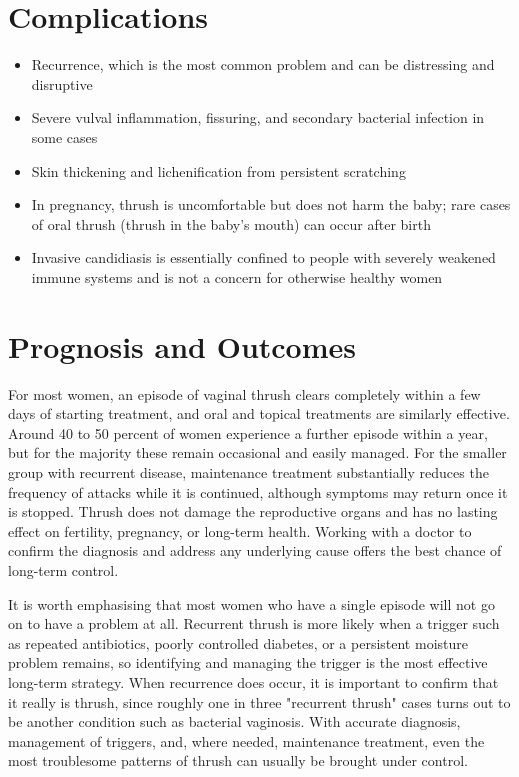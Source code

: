 \section*{Complications}
\begin{itemize}
    \item Recurrence, which is the most common problem and can be distressing and disruptive
    \item Severe vulval inflammation, fissuring, and secondary bacterial infection in some cases
    \item Skin thickening and lichenification from persistent scratching
    \item In pregnancy, thrush is uncomfortable but does not harm the baby; rare cases of oral thrush (thrush in the baby's mouth) can occur after birth
    \item Invasive candidiasis is essentially confined to people with severely weakened immune systems and is not a concern for otherwise healthy women
\end{itemize}

\section*{Prognosis and Outcomes}
For most women, an episode of vaginal thrush clears completely within a few days of starting treatment, and oral and topical treatments are similarly effective. Around 40 to 50 percent of women experience a further episode within a year, but for the majority these remain occasional and easily managed. For the smaller group with recurrent disease, maintenance treatment substantially reduces the frequency of attacks while it is continued, although symptoms may return once it is stopped. Thrush does not damage the reproductive organs and has no lasting effect on fertility, pregnancy, or long-term health. Working with a doctor to confirm the diagnosis and address any underlying cause offers the best chance of long-term control.

It is worth emphasising that most women who have a single episode will not go on to have a problem at all. Recurrent thrush is more likely when a trigger such as repeated antibiotics, poorly controlled diabetes, or a persistent moisture problem remains, so identifying and managing the trigger is the most effective long-term strategy. When recurrence does occur, it is important to confirm that it really is thrush, since roughly one in three "recurrent thrush" cases turns out to be another condition such as bacterial vaginosis. With accurate diagnosis, management of triggers, and, where needed, maintenance treatment, even the most troublesome patterns of thrush can usually be brought under control.

